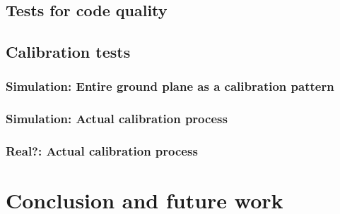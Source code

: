 \documentclass[english, printversion, nomenclature]{tuvisionthesis} %
\begin{document}
\section{Tests for code quality}
\section{Calibration tests}
\subsection{Simulation: Entire ground plane as a calibration pattern}
\subsection{Simulation: Actual calibration process}
\subsection{Real?: Actual calibration process}

\chapter{Conclusion and future work}

\end{document}
